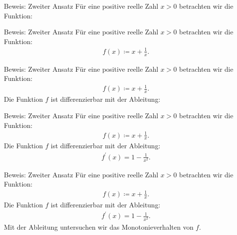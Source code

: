 \documentclass[10pt]{beamer}
\begin{document}
\begin{frame}{Beweis: Zweiter Ansatz}
    Für eine positive reelle Zahl \( x > 0 \) betrachten wir die Funktion:
\end{frame}



\begin{frame}{Beweis: Zweiter Ansatz}
    Für eine positive reelle Zahl \( x > 0 \) betrachten wir die Funktion:
    \begin{align*}
        f( x ) 
        \coloneq x + \frac{1}{x}.
    \end{align*}
\end{frame}



\begin{frame}{Beweis: Zweiter Ansatz}
    Für eine positive reelle Zahl \( x > 0 \) betrachten wir die Funktion:
    \begin{align*}
        f( x ) 
        \coloneq x + \frac{1}{x}.
    \end{align*}
    Die Funktion \( f \) ist differenzierbar mit der Ableitung:
\end{frame}



\begin{frame}{Beweis: Zweiter Ansatz}
    Für eine positive reelle Zahl \( x > 0 \) betrachten wir die Funktion:
    \begin{align*}
        f( x ) 
        \coloneq x + \frac{1}{x}.
    \end{align*}
    Die Funktion \( f \) ist differenzierbar mit der Ableitung:
    \begin{align*}
        f^{\prime}( x ) 
        = 1 - \frac{1}{x^{2}}.
    \end{align*}
\end{frame}



\begin{frame}{Beweis: Zweiter Ansatz}
    Für eine positive reelle Zahl \( x > 0 \) betrachten wir die Funktion:
    \begin{align*}
        f( x ) 
        \coloneq x + \frac{1}{x}.
    \end{align*}
    Die Funktion \( f \) ist differenzierbar mit der Ableitung:
    \begin{align*}
        f^{\prime}( x ) 
        = 1 - \frac{1}{x^{2}}.
    \end{align*}
    Mit der Ableitung untersuchen wir das Monotonieverhalten von \( f \).
\end{frame}
\end{document}
